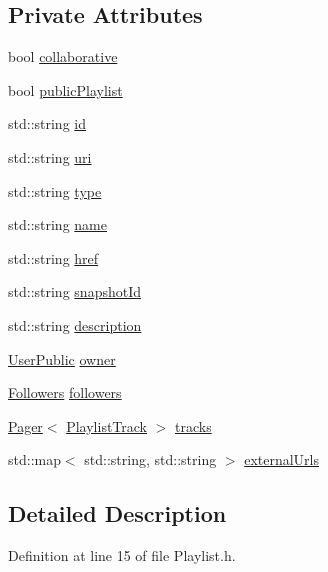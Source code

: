\subsection*{Private Attributes}
\begin{DoxyCompactItemize}
\item 
bool \mbox{\hyperlink{class_playlist_a292ead16298d6a878ac3bbc6a98ce37b}{collaborative}}
\item 
bool \mbox{\hyperlink{class_playlist_a88f0c7943b6b86c9017e2daa5df0964e}{public\+Playlist}}
\item 
std\+::string \mbox{\hyperlink{class_playlist_acbca3e2235543a11d0bca5a17789a97d}{id}}
\item 
std\+::string \mbox{\hyperlink{class_playlist_a9b0edc762375b2c55ece8941aff077e4}{uri}}
\item 
std\+::string \mbox{\hyperlink{class_playlist_a0167a906001dfd15fe84df3f7fdb370d}{type}}
\item 
std\+::string \mbox{\hyperlink{class_playlist_a6b06305db2f4b7bfadccd994665501cf}{name}}
\item 
std\+::string \mbox{\hyperlink{class_playlist_aa4f4ab91921e32b7f95ae7d933b979e2}{href}}
\item 
std\+::string \mbox{\hyperlink{class_playlist_ae7dea2d5e2aef27fcf6faa667358c341}{snapshot\+Id}}
\item 
std\+::string \mbox{\hyperlink{class_playlist_a5fd6ff7a7e61f85a97e26236c36eef3c}{description}}
\item 
\mbox{\hyperlink{class_user_public}{User\+Public}} \mbox{\hyperlink{class_playlist_a94aa4dbfbd684e9e92e821a06eb8ddeb}{owner}}
\item 
\mbox{\hyperlink{class_followers}{Followers}} \mbox{\hyperlink{class_playlist_aa720fd64c7d778938888002686c3b478}{followers}}
\item 
\mbox{\hyperlink{class_pager}{Pager}}$<$ \mbox{\hyperlink{class_playlist_track}{Playlist\+Track}} $>$ \mbox{\hyperlink{class_playlist_a11a10489219f1916b6d8a58c36ac6605}{tracks}}
\item 
std\+::map$<$ std\+::string, std\+::string $>$ \mbox{\hyperlink{class_playlist_aeaa259fcf7805cc25feeebaa80495b23}{external\+Urls}}
\end{DoxyCompactItemize}


\subsection{Detailed Description}


Definition at line 15 of file Playlist.\+h.



